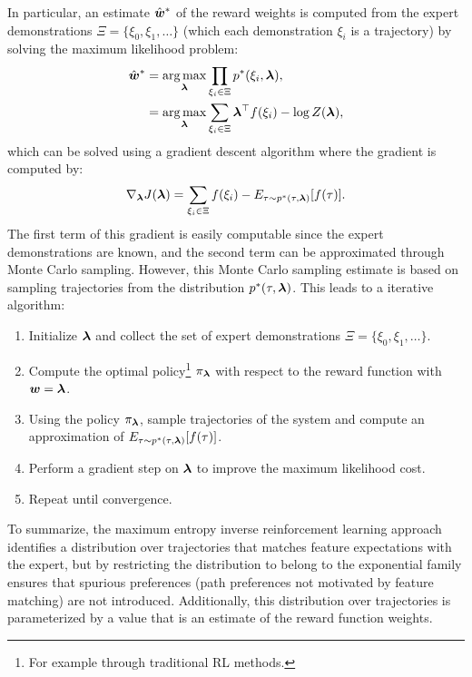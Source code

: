 In particular, an estimate $\hat{\bm{w}}^*$ of the reward weights is computed from the expert demonstrations $\Xi = \{\xi_0, \xi_1, \dots \}$ (which each demonstration $\xi_i$ is a trajectory) by solving the maximum likelihood problem:
\begin{equation*}
\begin{split}
\hat{\bm{w}}^* &= \underset{\bm{\lambda}}{\arg\max} \prod_{\xi_i \in \Xi} p^*(\xi_i, \bm{\lambda}), \\
&= \underset{\bm{\lambda}}{\arg\max} \sum_{\xi_i \in \Xi} \bm{\lambda}^\top  f(\xi_i) - \log Z(\bm{\lambda}), \\
\end{split}
\end{equation*}
which can be solved using a gradient descent algorithm where the gradient is computed by:
\begin{equation*}
\nabla_{\bm{\lambda}} J(\bm{\lambda}) = \sum_{\xi_i \in \Xi} f(\xi_i) - E_{\tau \sim p^*(\tau, \bm{\lambda})}[f(\tau)].  
\end{equation*}
The first term of this gradient is easily computable since the expert demonstrations are known, and the second term can be approximated through Monte Carlo sampling. However, this Monte Carlo sampling estimate is based on sampling trajectories from the distribution $p^*(\tau, \bm{\lambda})$. This leads to a iterative algorithm:
\begin{enumerate}
    \item Initialize $\bm{\lambda}$ and collect the set of expert demonstrations $\Xi = \{\xi_0, \xi_1, \dots\}$.
    \item Compute the optimal policy\footnote{For example through traditional RL methods.} $\pi_{\bm{\lambda}}$ with respect to the reward function with $\bm{w} = \bm{\lambda}$.
    \item Using the policy $\pi_{\bm{\lambda}}$, sample trajectories of the system and compute an approximation of $E_{\tau \sim p^*(\tau, \bm{\lambda})}[f(\tau)]$.
    \item Perform a gradient step on $\bm{\lambda}$ to improve the maximum likelihood cost.
    \item Repeat until convergence.
\end{enumerate}

To summarize, the maximum entropy inverse reinforcement learning approach identifies a distribution over trajectories that matches feature expectations with the expert, but by restricting the distribution to belong to the exponential family ensures that spurious preferences (path preferences not motivated by feature matching) are not introduced. Additionally, this distribution over trajectories is parameterized by a value that is an estimate of the reward function weights.

